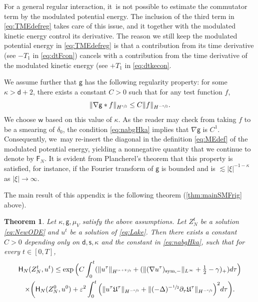 \documentclass[JEP,XML,SOM,Unicode,published]{cedram}
\newcommand{\psfrac}[2]{\sfrac{(#1)}{#2}}
\newcommand{\sym}{\textup{sym}}
\theoremstyle{plain}
\newtheorem{thm}{Theorem}[section]
\theoremstyle{definition}
\let\ga\gamma
\let\vep\varepsilon
\let\ka\kappa
\let\nab\nabla
\let\p\partial
\let\uz Z
\newcommand{\Uu}{\mathfrak{U}}
\newcommand{\Fr}{\mathsf{F}}
\newcommand{\Hr}{\mathsf{H}}
\renewcommand{\d}{\mathsf{d}}
\newcommand{\g}{{\mathsf{g}}}
\newcommand{\s}{\mathsf{s}}
\newcommand{\w}{\mathsf{w}}
\begin{document}
{For a general regular interaction, it~is not possible to estimate the commutator term by the modulated potential energy. The inclusion of the third term in \eqref{eq:TMEdefreg} takes care of this issue, and it together with the modulated kinetic energy control its derivative. The reason we still keep the modulated potential energy in \eqref{eq:TMEdefreg} is that a contribution from its time derivative (see $-T_1$ in \eqref{eq:dtFcon}) cancels with a contribution from the time derivative of the modulated kinetic energy (see $+T_1$ in \eqref{eq:dtkecon}.}

We assume further that $\g$ has the following regularity property: {for some $\ka>\d+2$,} there exists a constant $C>0$ such that for any test function $f$,
\begin{equation}\label{eq:nabgHka}
\|\nab\g\ast f\|_{H^{\sfrac{\ka}{2}}} \le C \|f\|_{H^ {-\sfrac{\ka}{2}}}.
\end{equation}
{We choose $\w$ based on this value of $\ka$.} As the reader may check from taking $f$ to be a smearing of $\delta_0$, the condition \eqref{eq:nabgHka} implies that $\nab\g$ is {$C^1$}. Consequently, we~may re-insert the diagonal in the definition \eqref{eq:MEdef} of the modulated potential energy, yielding a nonnegative quantity {that we continue to denote by $\Fr_N$}. It is evident from Plancherel's theorem that this property is satisfied, for instance, if the Fourier transform of $\g$ is bounded and is $\lesssim |\xi|^{-1-\ka}$ as $|\xi|\to\infty$.

The main result of this appendix is the following theorem (\cf \cref{thm:mainSMFrig} above).

\begin{thm}\label{thm:mainSMFrigreg}
Let $\ka,\g,\mu_V$ satisfy the above assumptions. Let $Z_N^t$ be a solution \eqref{eq:NewODE} and $u^t$ be a solution of \eqref{eq:Lake}. Then there {exists a constant $C>0$} depending only on {$\d,\s,\ka$ and the constant in \eqref{eq:nabgHka}}, such that for every $t\in [0,T]$,
\begin{multline}\label{eq:SMFrigreg}
\Hr_{N}(\uz_N^t,u^t) \le \exp\Big(C\int_0^t(\|u^\tau\|_{H^{\psfrac{\ka+2}{2}}} + (\|(\nab u^\tau)_{\sym,-} \|_{L^\infty}+\tfrac12-\ga)_+ ) d\tau\Big)\\
\times\biggl(\Hr_{N}(\uz_N^0,u^0) + \vep^2\int_0^t \Big( \|u^\tau\Uu^\tau\|_{H^ {-\sfrac{\ka}{2}}} + \|(-\Delta)^{-\sfrac{1}{2}}\p_\tau \Uu^\tau\|_{H^ {-\sfrac{\ka}{2}}}\Big)^2 d\tau\biggr).
\end{multline}
\end{thm}
\end{document}
